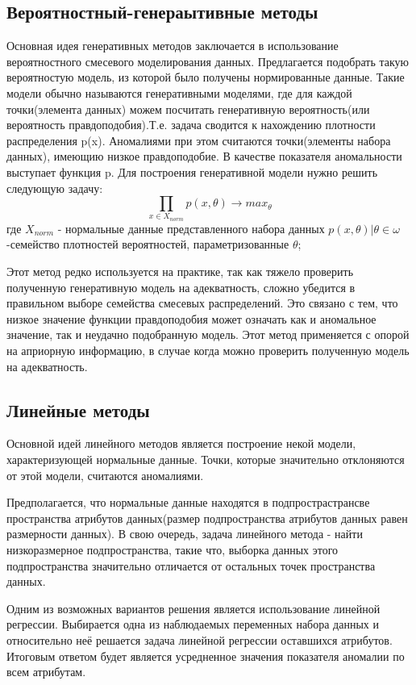 \subsection{Вероятностный-генераытивные методы}
Основная идея генеративных методов заключается в использование вероятностного смесевого моделирования данных. Предлагается подобрать такую вероятностую модель, из которой было получены нормированные данные. Такие модели обычно называются генеративными моделями, где для каждой точки(элемента данных) можем посчитать генеративную вероятность(или вероятность правдоподобия).Т.е. задача  сводится к нахождению плотности распределения p(x). Аномалиями при этом  считаются точки(элементы набора данных), имеющию низкое правдоподобие. В качестве показателя аномальности выступает функция p.
Для построения генеративной модели нужно решить следующую задачу:
	\begingroup
	\Large
	\begin{equation}
	\prod \limits_{x \in X_{norm}} p(x,\theta)  \rightarrow max_\theta
		\end{equation}
	\endgroup
		где \begingroup \Large$ X_{norm}$ \endgroup - нормальные данные представленного набора данных ${p(x,\theta)|\theta \in \omega}$ -семейство плотностей вероятностей, параметризованные $\theta$;
		
Этот метод редко используется на практике, так как тяжело проверить полученную генеративную модель на адекватность, сложно  убедится в правильном выборе семейства смесевых распределений. Это связано с тем, что низкое значение функции правдоподобия может означать как и аномальное значение, так и неудачно подобранную модель. Этот метод применяется с опорой на априорную информацию, в случае когда можно проверить полученную модель на адекватность.
\subsection{Линейные методы}
Основной идей линейного методов является построение некой  модели, характеризующей нормальные данные. Точки, которые значительно отклоняются от этой модели, считаются аномалиями.

Предполагается, что нормальные данные  находятся в подпрострастрансве пространства атрибутов данных(размер подпространства атрибутов данных равен размерности данных). В свою очередь, задача линейного метода - найти низкоразмерное подпространства, такие что, выборка данных этого подпространства значительно отличается от остальных точек пространства данных.

Одним из возможных вариантов решения является использование линейной регрессии. Выбирается одна из наблюдаемых переменных  набора данных и относительно неё решается задача линейной регрессии оставшихся атрибутов. Итоговым ответом будет является усредненное значения показателя аномалии по всем атрибутам. 

